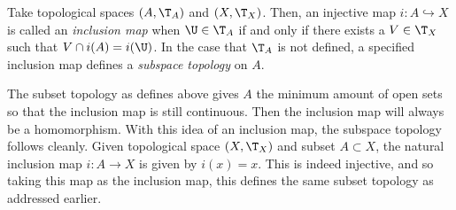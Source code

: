\begin{definition}
	Take topological spaces $(A, \T_A)$ and $(X,\T_X)$. Then, an injective map $i: A \hookrightarrow X$ is called an \emph{inclusion map} when $\U \in \T_A$ if and only if there exists a $V \in \T_X$ such that $V \cap i(A) = i(\U)$. In the case that $\T_A$ is not defined, a specified inclusion map defines a \emph{subspace topology} on $A$.
\end{definition}
The subset topology as defines above gives $A$ the minimum amount of open sets so that the inclusion map is still continuous. Then the inclusion map will always be a homomorphism.
With this idea of an inclusion map, the subspace topology follows cleanly. Given topological space $(X, \T_X)$ and subset $A \subset X$, the natural inclusion map $i: A \to X$ is given by $i(x) = x$. This is indeed injective, and so taking this map as the inclusion map, this defines the same subset topology as addressed earlier.